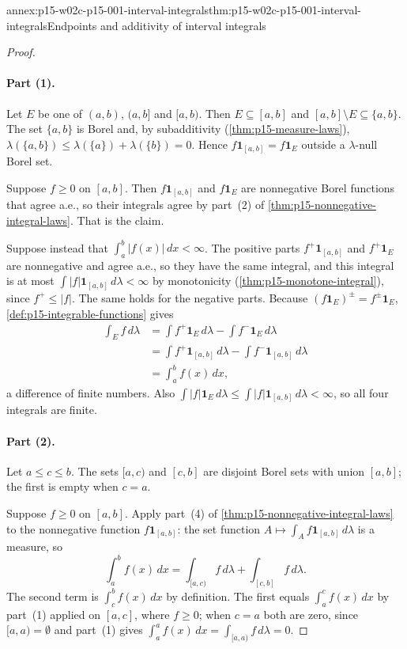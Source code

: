 \begin{annexitem}{annex:p15-w02c-p15-001-interval-integrals}{thm:p15-w02c-p15-001-interval-integrals}{Endpoints and additivity of interval integrals}
\begin{proof}
\paragraph{Part (1).}
Let \(E\) be one of \((a,b)\), \((a,b]\) and \([a,b)\). Then
\(E\subseteq[a,b]\) and \([a,b]\setminus E\subseteq\{a,b\}\). The set
\(\{a,b\}\) is Borel and, by subadditivity
(\cref{thm:p15-measure-laws}),
\(\lambda(\{a,b\})\leq\lambda(\{a\})+\lambda(\{b\})=0\). Hence
\(f\mathbf1_{[a,b]}=f\mathbf1_E\) outside a \(\lambda\)-null Borel set.

Suppose \(f\geq0\) on \([a,b]\). Then \(f\mathbf1_{[a,b]}\) and
\(f\mathbf1_E\) are nonnegative Borel functions that agree a.e., so their
integrals agree by part~(2) of \cref{thm:p15-nonnegative-integral-laws}.
That is the claim.

Suppose instead that \(\int_a^b|f(x)|\,dx<\infty\). The positive parts
\(f^+\mathbf1_{[a,b]}\) and \(f^+\mathbf1_E\) are nonnegative and agree
a.e., so they have the same integral, and this integral is at most
\(\int|f|\mathbf1_{[a,b]}\,d\lambda<\infty\) by monotonicity
(\cref{thm:p15-monotone-integral}), since \(f^+\leq|f|\). The same holds
for the negative parts. Because \((f\mathbf1_E)^\pm=f^\pm\mathbf1_E\),
\cref{def:p15-integrable-functions} gives
\[
 \begin{aligned}
 \int_Ef\,d\lambda
 &=\int f^+\mathbf1_E\,d\lambda-\int f^-\mathbf1_E\,d\lambda\\
 &=\int f^+\mathbf1_{[a,b]}\,d\lambda-\int f^-\mathbf1_{[a,b]}\,d\lambda\\
 &=\int_a^bf(x)\,dx,
 \end{aligned}
\]
a difference of finite numbers. Also
\(\int|f|\mathbf1_E\,d\lambda\leq\int|f|\mathbf1_{[a,b]}\,d\lambda<\infty\),
so all four integrals are finite.

\paragraph{Part (2).}
Let \(a\leq c\leq b\). The sets \([a,c)\) and \([c,b]\) are disjoint
Borel sets with union \([a,b]\); the first is empty when \(c=a\).

Suppose \(f\geq0\) on \([a,b]\). Apply part~(4) of
\cref{thm:p15-nonnegative-integral-laws} to the nonnegative function
\(f\mathbf1_{[a,b]}\): the set function
\(A\mapsto\int_Af\mathbf1_{[a,b]}\,d\lambda\) is a measure, so
\[
 \int_a^bf(x)\,dx
 =\int_{[a,c)}f\,d\lambda+\int_{[c,b]}f\,d\lambda .
\]
The second term is \(\int_c^bf(x)\,dx\) by definition. The first equals
\(\int_a^cf(x)\,dx\) by part~(1) applied on \([a,c]\), where \(f\geq0\);
when \(c=a\) both are zero, since \([a,a)=\emptyset\) and part~(1) gives
\(\int_a^af(x)\,dx=\int_{[a,a)}f\,d\lambda=0\).


\end{proof}
\end{annexitem}
